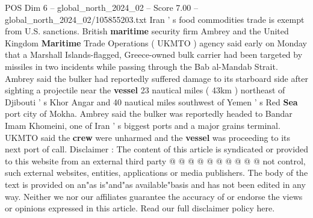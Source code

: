 \begin{textsample}{POS Dim 6 – global\_north\_2024\_02 – Score 7.00 – global\_north\_2024\_02/105855203.txt}
Iran ' s food commodities trade is exempt from U.S. sanctions.
British \textbf{maritime} security firm Ambrey and the United Kingdom \textbf{Maritime} Trade Operations ( UKMTO ) agency said early on Monday that a Marshall Islands-flagged, Greece-owned bulk carrier had been targeted by missiles in two incidents while passing through the Bab al-Mandab Strait.
Ambrey said the bulker had reportedly suffered damage to its starboard side after sighting a projectile near the \textbf{vessel} 23 nautical miles ( 43km ) northeast of Djibouti ' s Khor Angar and 40 nautical miles southwest of Yemen ' s Red \textbf{Sea} port city of Mokha.
Ambrey said the bulker was reportedly headed to Bandar Imam Khomeini, one of Iran ' s biggest ports and a major grains terminal.
UKMTO said the \textbf{crew} were unharmed and the \textbf{vessel} was proceeding to its next port of call.
Disclaimer : The content of this article is syndicated or provided to this website from an external third party @ @ @ @ @ @ @ @ @ @ not control, such external websites, entities, applications or media publishers.
The body of the text is provided on an"as is"and"as available"basis and has not been edited in any way.
Neither we nor our affiliates guarantee the accuracy of or endorse the views or opinions expressed in this article.
Read our full disclaimer policy here.

\end{textsample}
